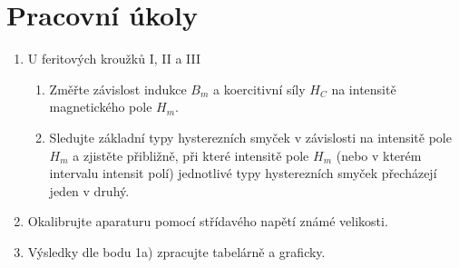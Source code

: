 \documentclass[a4paper]{article}
\author{Vladislav Wohlrath}
\begin{document}
\begin{titlepage}

\end{titlepage}

\section*{Pracovní úkoly}
\begin{enumerate}
\item U feritových kroužků I, II a III
	\begin{enumerate}
	\item Změřte závislost indukce $B_m$ a koercitivní síly $H_C$ na intensitě magnetického pole $H_m$.
    \item Sledujte základní typy hysterezních smyček v závislosti na intensitě pole $H_m$ a zjistěte přibližně, při které intensitě pole $H_m$ (nebo v kterém intervalu intensit polí) jednotlivé typy hysterezních smyček přecházejí jeden v druhý.
    \end{enumerate}
\item Okalibrujte aparaturu pomocí střídavého napětí známé velikosti.
\item Výsledky dle bodu 1a) zpracujte tabelárně a graficky.

\end{enumerate}










\printbibliography[title={Seznam použité literatury}]
\end{document}
